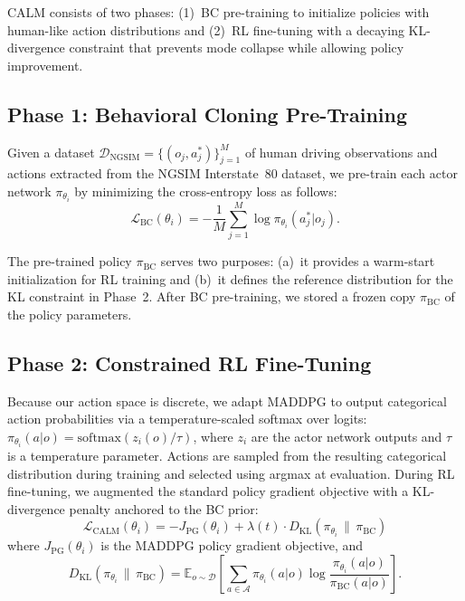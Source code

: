\documentclass[journal]{IEEEtran}
\newcommand{\KL}{\mathrm{KL}}
\newcommand{\E}{\mathbb{E}}
\newcommand{\cA}{\mathcal{A}}
\begin{document}
CALM consists of two phases: (1)~BC pre-training to initialize policies with human-like action distributions and (2)~RL fine-tuning with a decaying KL-divergence constraint that prevents mode collapse while allowing policy improvement.

\subsection{Phase 1: Behavioral Cloning Pre-Training}

Given a dataset $\mathcal{D}_{\text{NGSIM}} = \{(o_j, a_j^*)\}_{j=1}^{M}$ of human driving observations and actions extracted from the NGSIM Interstate~80 dataset, we pre-train each actor network $\pi_{\theta_i}$ by minimizing the cross-entropy loss as follows:
\begin{equation}
    \mathcal{L}_{\text{BC}}(\theta_i) = -\frac{1}{M}\sum_{j=1}^{M} \log \pi_{\theta_i}(a_j^* | o_j).
    \label{eq:bc_loss}
\end{equation}

The pre-trained policy $\pi_{\text{BC}}$ serves two purposes: (a)~it provides a warm-start initialization for RL training and (b)~it defines the reference distribution for the KL constraint in Phase~2.
After BC pre-training, we stored a frozen copy $\pi_{\text{BC}}$ of the policy parameters.

\subsection{Phase 2: Constrained RL Fine-Tuning}

Because our action space is discrete, we adapt MADDPG to output categorical action probabilities via a temperature-scaled softmax over logits: $\pi_{\theta_i}(a|o) = \text{softmax}(z_i(o)/\tau)$, where $z_i$ are the actor network outputs and $\tau$ is a temperature parameter. Actions are sampled from the resulting categorical distribution during training and selected using argmax at evaluation. During RL fine-tuning, we augmented the standard policy gradient objective with a KL-divergence penalty anchored to the BC prior:
\begin{equation}
    \mathcal{L}_{\text{CALM}}(\theta_i) = -J_{\text{PG}}(\theta_i) + \lambda(t) \cdot D_{\KL}\!\left(\pi_{\theta_i} \,\|\, \pi_{\text{BC}}\right)
    \label{eq:calm_loss}
\end{equation}
where $J_{\text{PG}}(\theta_i)$ is the MADDPG policy gradient objective, and
\begin{equation}
    D_{\KL}\!\left(\pi_{\theta_i} \,\|\, \pi_{\text{BC}}\right) = \E_{o \sim \mathcal{D}} \left[\sum_{a \in \cA} \pi_{\theta_i}(a|o) \log \frac{\pi_{\theta_i}(a|o)}{\pi_{\text{BC}}(a|o)}\right].
\end{equation}
\end{document}
